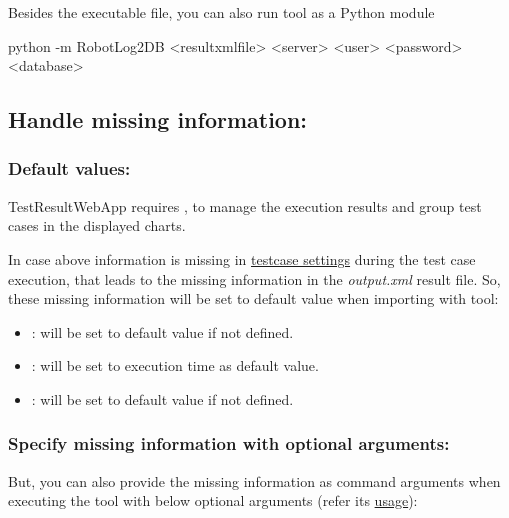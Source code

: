 Besides the executable file, you can also run tool as a Python module
\begin{robotlog}
python -m RobotLog2DB <resultxmlfile> <server> <user> <password> <database>
\end{robotlog}

\subsection{Handle missing information:}
\subsubsection{Default values:}
TestResultWebApp requires ,  to manage the 
execution results and  group test cases in the displayed charts.

In case above information is missing in \hyperref[description-robotframework-testcase-settings]
{testcase settings} during the test case execution, that leads to the 
missing information in the \emph{output.xml} result file.
So, these missing information will be set to default value when importing with
\href{https://github.com/test-fullautomation/robotframework-robotlog2db}{\pkg}
tool:

\begin{itemize}
\tightlist
\item {}: will be set to default value  if not defined.

\item {}: will be set to execution time
   as default value.

\item {}: will be set to default value  if not
  defined.
\end{itemize}

\subsubsection{Specify missing information with optional arguments:}
But, you can also provide the missing information as command arguments when executing the
\href{https://github.com/test-fullautomation/robotframework-robotlog2db}{\pkg}
tool with below optional arguments (refer its
\href{https://github.com/test-fullautomation/robotframework-robotlog2db\#usage}{usage}):

